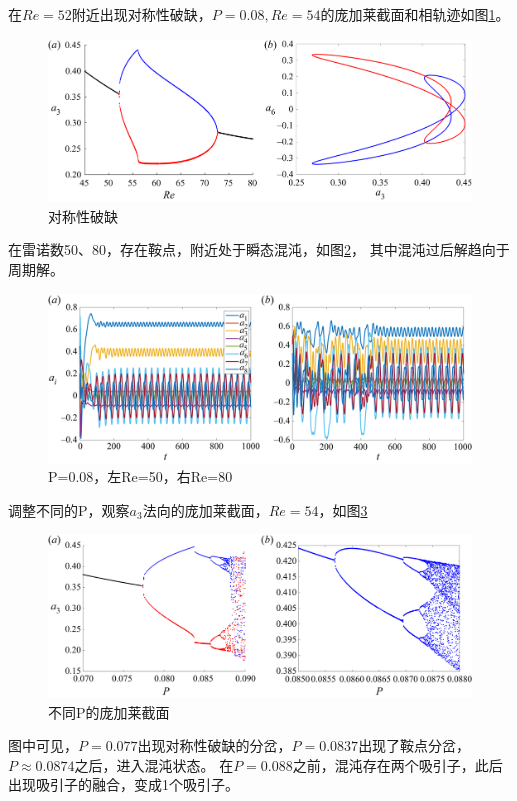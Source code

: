 \documentclass[UTF8,zihao=5]{ctexart} %
\begin{document}
在$Re=52$附近出现对称性破缺，$P=0.08, Re=54$的庞加莱截面和相轨迹如图\ref{fig:fig8}。
\begin{figure}[H]
    \centering
    \includegraphics[width=12cm]{fig8.png}  %
    \caption{对称性破缺}
    \label{fig:fig8}
\end{figure}

在雷诺数50、80，存在鞍点，附近处于瞬态混沌，如图\ref{fig:fig9}，
其中混沌过后解趋向于周期解。
\begin{figure}[H]
    \centering
    \includegraphics[width=12cm]{fig9.png}  %
    \caption{P=0.08，左Re=50，右Re=80}
    \label{fig:fig9}
\end{figure}

调整不同的P，观察$a_3$法向的庞加莱截面，$Re=54$，如图\ref{fig:fig10}
\begin{figure}[H]
    \centering
    \includegraphics[width=12cm]{fig10.png}  %
    \caption{不同P的庞加莱截面}
    \label{fig:fig10}
\end{figure}

图中可见，$P=0.077$出现对称性破缺的分岔，$P=0.0837$出现了鞍点分岔，
$P\approx0.0874$之后，进入混沌状态。
在$P=0.088$之前，混沌存在两个吸引子，此后出现吸引子的融合，变成1个吸引子。
\end{document}
